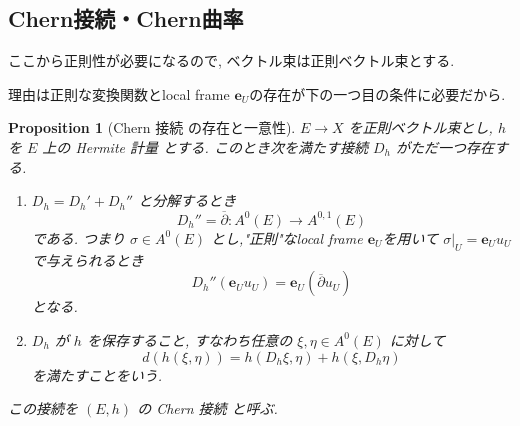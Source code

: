 \documentclass[dvipdfmx,a4paper,11pt]{article} %
\newtheorem{prop}[thm]{Proposition}
\theoremstyle{definition}
\theoremstyle{remark}
\numberwithin{equation}{section}
\begin{document}
\subsection{Chern接続・Chern曲率}

\begin{tcolorbox}[mybox]
ここから正則性が必要になるので, ベクトル束は正則ベクトル束とする. 
\end{tcolorbox}
理由は正則な変換関数とlocal frame $\mathbf{e}_U$の存在が下の一つ目の条件に必要だから. 

\begin{prop}[Chern 接続 の存在と一意性]
\(E\to X\) を正則ベクトル束とし, \(h\) を \(E\) 上の Hermite 計量 とする. このとき次を満たす接続 \(D_h\) がただ一つ存在する.
\begin{enumerate}
\item \(D_{h}=D_{h}' +  D_{h}''\) と分解するとき
\[
D_{h}''=\overline{\partial}
\colon A^0(E) \to A^{0,1}(E)
\]
である. つまり \(\sigma\in A^0(E)\) とし,"正則"なlocal frame $\mathbf{e}_U$を用いて
\(\sigma|_{U}=\mathbf{e}_U u_U\) で与えられるとき
\[
D_{h}''(\mathbf{e}_U u_U)=\mathbf{e}_U  (\overline{\partial} u_U)
\]
となる.
\item \(D_h\) が \(h\) を保存すること, すなわち任意の \(\xi,\eta\in A^0(E)\) に対して
\[
d(h(\xi,\eta))=h(D_h\xi,\eta)+h(\xi,D_h\eta)
\]
を満たすことをいう.
\end{enumerate}
この接続を \((E,h)\) の Chern 接続 と呼ぶ.
\end{prop}
\end{document}
